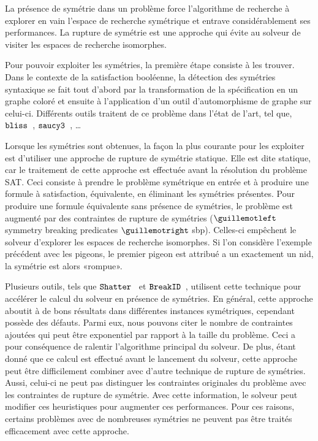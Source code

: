 La présence de symétrie dans un problème force l'algorithme de recherche à explorer en vain l'espace de recherche symétrique et entrave considérablement ses performances. La rupture de symétrie est une approche qui évite au solveur de visiter les espaces de recherche isomorphes.

Pour pouvoir exploiter les symétries, la première étape consiste à les trouver. Dans le contexte de la satisfaction booléenne, la détection des symétries syntaxique se fait tout d'abord par la transformation de la spécification en un graphe coloré et ensuite à l'application d'un outil d'automorphisme de graphe sur celui-ci.
Différents outils traitent de ce problème dans l'état de l'art, tel que, $\texttt{bliss}$~\cite{JunttilaKaski:ALENEX2007}, $\texttt{saucy3}$~\cite{katebi2010symmetry}, …


Lorsque les symétries sont obtenues, la façon la plus courante pour les exploiter est d'utiliser une approche de rupture de symétrie statique. Elle est dite statique, car le traitement de cette approche  est effectuée avant la résolution du problème SAT.
Ceci consiste à prendre le problème symétrique en entrée et à produire une formule à satisfaction, équivalente, en éliminant les symétries présentes. %
Pour produire une formule équivalente sans présence de symétries, le problème est augmenté par des 
contraintes de rupture de  symétries ($\guillemotleft$symmetry breaking predicates $\guillemotright$ sbp). Celles-ci empêchent le solveur d'explorer les espaces de recherche isomorphes. 
Si l'on considère l'exemple précédent avec les pigeons, le premier pigeon est attribué a un
exactement un nid, la symétrie est alors «rompue».

Plusieurs outils, tels que $\texttt{Shatter}$~\cite{aloul06} et $\texttt{BreakID}$~\cite{devriendt2016improved}, utilisent cette technique pour accélérer le calcul du solveur en présence de symétries.
En général, cette approche aboutit à de bons résultats dans différentes instances symétriques, cependant possède des défauts. Parmi eux, nous pouvons citer le nombre de contraintes ajoutées qui peut être exponentiel par rapport à la taille du problème. Ceci 
a pour conséquence de ralentir l'algorithme principal du solveur.
De plus, étant donné que ce calcul est effectué avant le lancement du solveur, cette approche peut être difficilement combiner avec d'autre technique de rupture de symétries. Aussi, celui-ci ne peut pas distinguer les contraintes originales du problème avec les contraintes de rupture de symétrie. Avec cette information, le solveur peut modifier ces heuristiques pour augmenter ces performances.
Pour ces raisons, certains problèmes avec de nombreuses symétries ne peuvent pas être traités efficacement avec cette approche.

